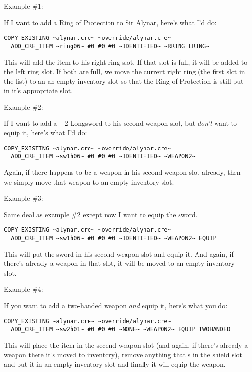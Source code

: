 \documentclass{article}
\begin{document}
Example \#1:

If I want to add a Ring of Protection to Sir Alynar, here's what I'd do:

\begin{verbatim}
COPY_EXISTING ~alynar.cre~ ~override/alynar.cre~
  ADD_CRE_ITEM ~ring06~ #0 #0 #0 ~IDENTIFIED~ ~RRING LRING~
\end{verbatim}

This will add the item to his right ring slot. If that slot is full, it
will be added to the left ring slot. If both are full, we move the current
right ring (the first slot in the list) to an an empty inventory slot so
that the Ring of Protection is still put in it's appropriate slot.

Example \#2:

If I want to add a +2 Longsword to his second weapon slot, but \emph{don't}
want to equip it, here's what I'd do:

\begin{verbatim}
COPY_EXISTING ~alynar.cre~ ~override/alynar.cre~
  ADD_CRE_ITEM ~sw1h06~ #0 #0 #0 ~IDENTIFIED~ ~WEAPON2~
\end{verbatim}

Again, if there happens to be a weapon in his second weapon slot already,
then we simply move that weapon to an empty inventory slot.

Example \#3:

Same deal as example \#2 except now I want to equip the sword.

\begin{verbatim}
COPY_EXISTING ~alynar.cre~ ~override/alynar.cre~
  ADD_CRE_ITEM ~sw1h06~ #0 #0 #0 ~IDENTIFIED~ ~WEAPON2~ EQUIP
\end{verbatim}

This will put the sword in his second weapon slot and equip it.  And again,
if there's already a weapon in that slot, it will be moved to an empty
inventory slot.

Example \#4:

If you want to add a two-handed weapon \emph{and} equip it, here's what you do:

\begin{verbatim}
COPY_EXISTING ~alynar.cre~ ~override/alynar.cre~
  ADD_CRE_ITEM ~sw2h01~ #0 #0 #0 ~NONE~ ~WEAPON2~ EQUIP TWOHANDED
\end{verbatim}

This will place the item in the second weapon slot (and again, if there's
already a weapon there it's moved to inventory), remove anything that's in
the shield slot and put it in an empty inventory slot and finally it will
equip the weapon.
\end{document}
